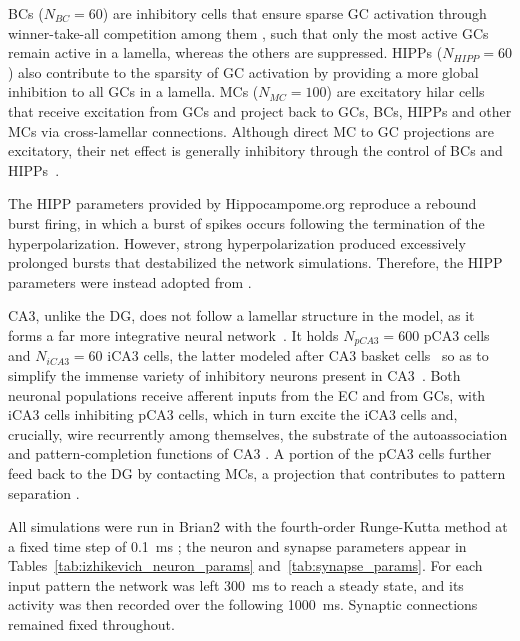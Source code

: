 \documentclass[pdflatex,sn-basic]{sn-jnl}%
\theoremstyle{thmstyleone}%
\theoremstyle{thmstyletwo}%
\theoremstyle{thmstylethree}%
\begin{document}
BCs ($N_{BC} = 60$) are inhibitory cells that ensure sparse GC activation through winner-take-all competition among them
\citep{coultripCortical1992, chavlisDendrites2017, kimAdult2024}, such that only the most active GCs remain active in a lamella,
whereas the others are suppressed. HIPPs ($N_{HIPP} = 60$) also contribute to the sparsity of GC activation by providing a more
global inhibition to all GCs in a lamella. MCs ($N_{MC} = 100$) are excitatory hilar cells that receive excitation from GCs and
project back to GCs, BCs, HIPPs and other MCs via cross-lamellar connections. Although direct MC to GC projections are excitatory,
their net effect is generally inhibitory through the control of BCs and HIPPs~\citep{myersRole2009, scharfmanHilar2013}.

The HIPP parameters provided by Hippocampome.org \citep{wheelerHippocampomeorg2023} reproduce a rebound burst firing, in which a
burst of spikes occurs following the termination of the hyperpolarization. However, strong hyperpolarization produced excessively
prolonged bursts that destabilized the network simulations. Therefore, the HIPP parameters were instead adopted from
\citet{modakIzhikevich2018}.

CA3, unlike the DG, does not follow a lamellar structure in the model, as it forms a far more integrative neural
network~\citep{pakHippocampal2022, watsonHuman2025}. It holds $N_{pCA3} = 600$ pCA3 cells and $N_{iCA3} = 60$ iCA3 cells, the
latter modeled after CA3 basket cells~\citep{wheelerHippocampomeorg2023} so as to simplify the immense variety of inhibitory
neurons present in CA3~\citep{kopsickFormation2024}. Both neuronal populations receive afferent inputs from the EC and from GCs,
with iCA3 cells inhibiting pCA3 cells, which in turn excite the iCA3 cells and, crucially, wire recurrently among themselves, the
substrate of the autoassociation and pattern-completion functions of CA3 \citep{rollsMechanisms2013, kopsickFormation2024}. A
portion of the pCA3 cells further feed back to the DG by contacting MCs, a projection that contributes to pattern separation
\citep{myersPattern2011}.

All simulations were run in Brian2 \citep{stimbergBrian2019a} with the fourth-order Runge-Kutta method at a fixed time step of
\SI{0.1}{\milli\second} \citep{butcherHistory1996}; the neuron and synapse parameters appear in
Tables~\ref{tab:izhikevich_neuron_params} and~\ref{tab:synapse_params}. For each input pattern the network was left
\SI{300}{\milli\second} to reach a steady state, and its activity was then recorded over the following \SI{1000}{\milli\second}.
Synaptic connections remained fixed throughout.
\end{document}
